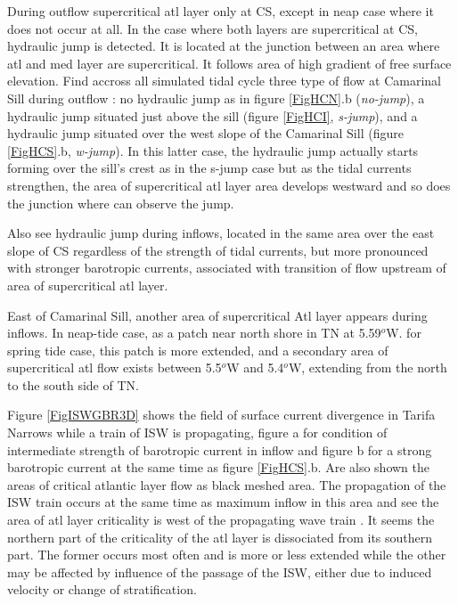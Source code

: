 During outflow supercritical atl layer only at CS, except in neap case where it does not occur at all. In the case where both layers are supercritical at CS, hydraulic jump is detected. It is located at the junction between an area where atl and med layer are supercritical. It follows area of high gradient of free surface elevation.  Find accross all simulated tidal cycle three type of flow at Camarinal Sill during outflow : no hydraulic jump as in figure \ref{FigHCN}.b (\textit{no-jump}), a hydraulic jump situated just above the sill (figure \ref{FigHCI}, \textit{s-jump}), and a hydraulic jump situated over the west slope of the Camarinal Sill (figure \ref{FigHCS}.b, \textit{w-jump}). In this latter case, the hydraulic jump actually starts forming over the sill's crest as in the s-jump case but as the tidal currents strengthen, the area of supercritical atl layer area develops westward and so does the junction where can observe the jump.

Also see hydraulic jump during inflows, located in the same area over the east slope of CS regardless of the strength of tidal currents, but more pronounced with stronger barotropic currents, associated with transition of flow upstream of area of supercritical atl layer.

East of Camarinal Sill, another area of supercritical Atl layer appears during inflows. In neap-tide case, as a patch near north shore in TN at 5.59$^o$W. for spring tide case, this patch is more extended, and a secondary area of supercritical atl flow exists between 5.5$^o$W and 5.4$^o$W, extending from the north to the south side of TN. 

Figure \ref{FigISWGBR3D} shows the field of surface current divergence in Tarifa Narrows while a train of ISW is propagating, figure a for condition of intermediate strength of barotropic current in inflow and figure b for a strong barotropic current at the same time as figure \ref{FigHCS}.b. Are also shown the areas of critical atlantic layer flow as black meshed area. The propagation of the ISW train occurs at the same time as maximum inflow in this area and see the area of atl layer criticality is west of the propagating wave train . It seems the northern part of the criticality of the atl layer is dissociated from its southern part. The former occurs most often and is more or less extended while the other may be affected by influence of the passage of the ISW, either due to induced velocity or change of stratification.




